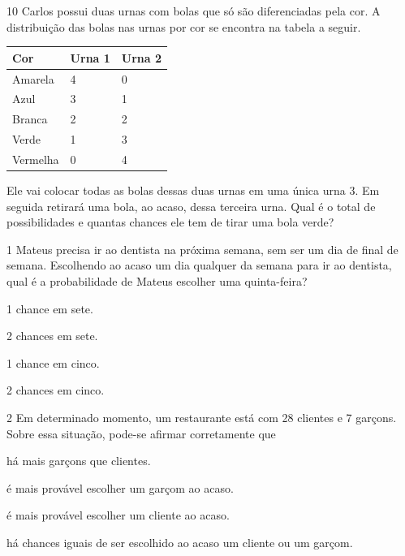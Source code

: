 \pagebreak
\num{10} Carlos possui duas urnas com bolas que só são diferenciadas pela cor. A
distribuição das bolas nas urnas por cor se encontra na tabela a
seguir.

\begin{longtable}[]{@{}lll@{}}
\toprule
Cor & Urna 1 & Urna 2\tabularnewline
\midrule
\endhead
Amarela & 4 & 0\tabularnewline
Azul & 3 & 1\tabularnewline
Branca & 2 & 2\tabularnewline
Verde & 1 & 3\tabularnewline
Vermelha & 0 & 4\tabularnewline
\bottomrule
\end{longtable}

Ele vai colocar todas as bolas dessas duas urnas em uma única urna 3. Em
seguida retirará uma bola, ao acaso, dessa terceira urna. Qual é o total de possibilidades e quantas chances ele tem de tirar uma bola verde?

\begin{mdframed}[linewidth=2pt,linecolor=salmao,roundcorner=2pt]


\vspace{1cm}
\end{mdframed}



\num{1} Mateus precisa ir ao dentista na próxima semana, sem ser um dia de final de semana. Escolhendo ao acaso um dia
qualquer da semana para ir ao dentista, qual é a probabilidade de Mateus
escolher uma quinta-feira?

\begin{escolha}
\item
  1 chance em sete.
\item
  2 chances em sete.
\item
  1 chance em cinco.
\item
  2 chances em cinco.
\end{escolha}


\num{2} Em determinado momento, um restaurante está com 28 clientes e 7
garçons. Sobre essa situação, pode-se afirmar corretamente que

\begin{escolha}
\item
  há mais garçons que clientes.
\item
  é mais provável escolher um garçom ao acaso.
\item
  é mais provável escolher um cliente ao acaso.
\item
  há chances iguais de ser escolhido ao acaso um cliente ou um garçom.
\end{escolha}


